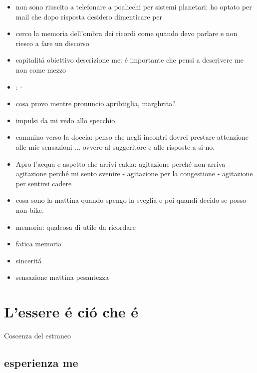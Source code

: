 \begin{itemize}
\item non sono riuscito a telefonare a poalicchi per sistemi planetari: ho optato per mail che dopo risposta desidero dimenticare per 
\item cerco la memoria dell'ombra dei ricordi come quando devo parlare e non riesco a fare un discorso
\item capitalit\'a obiettivo descrizione me: \'e importante che pensi a descrivere me non come mezzo
\item {}:  - 
\item cosa provo mentre pronuncio apribtiglia, marghrita?
\item impulsi da mi vedo allo specchio
\item cammino verso la doccia: penso che negli incontri dovrei prestare attenzione alle mie sensazioni ... ovvero al suggeritore e alle risposte a-si-no. 
\item Apro l'acqua e aspetto che arrivi calda: agitazione perch\'e non arriva - agitazione perch\'e mi sento svenire - agitazione per la congestione - agitazione per sentirsi cadere
\item cosa sono la mattina quando spengo la sveglia e poi quandi decido se posso non bike.
\item memoria: qualcosa di utile da ricordare
\item fatica memoria
\item sincerit\'a
\item sensazione mattina pesantezza
\end{itemize}

\section{L'essere \'e ci\'o che \'e}
Coscenza del estraneo

\subsection{esperienza me}

